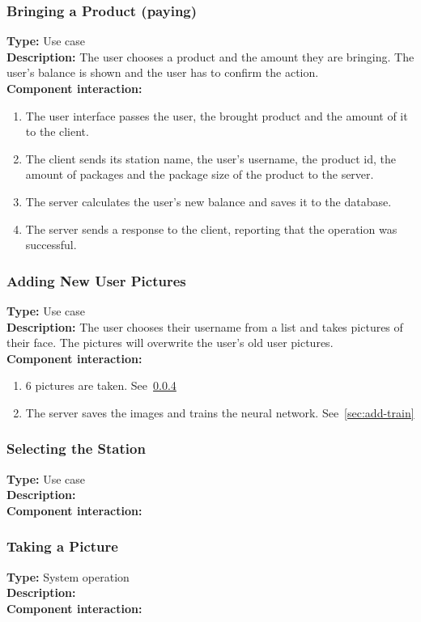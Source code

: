 \documentclass[11pt]{article}
\begin{document}
\subsubsection{Bringing a Product (paying)}
\textbf{Type:} Use case\\
\textbf{Description:} The user chooses a product and the amount they are bringing. 
The user's balance is shown and the user has to confirm the action.\\
\textbf{Component interaction:}
\begin{enumerate} 
\item{The user interface passes the user, the brought product and the amount of it to the client.}
\item{The client sends its station name, the user's username, the product id, the amount of packages and the package size of the product to the server.}
\item{The server calculates the user's new balance and saves it to the database.}
\item{The server sends a response to the client, reporting that the operation was successful.}
\end{enumerate}

\subsubsection{Adding New User Pictures}
\textbf{Type:} Use case\\
\textbf{Description:} The user chooses their username from a list and takes pictures of their face. 
The pictures will overwrite the user's old user pictures.\\
\textbf{Component interaction:}
\begin{enumerate} 
\item{6 pictures are taken. See~\ref{sec:pic}}
\item{The server saves the images and trains the neural network. See~\ref{sec:add-train}}
\end{enumerate}

\subsubsection{Selecting the Station}
\textbf{Type:} Use case\\
\textbf{Description:} \\
\textbf{Component interaction:}\\

\subsubsection{Taking a Picture}
\label{sec:pic}
\textbf{Type:} System operation\\
\textbf{Description:} \\
\textbf{Component interaction:}\\
\end{document}
